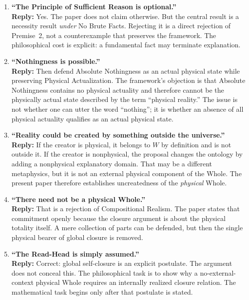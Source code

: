 \documentclass[11pt]{article}
\theoremstyle{canonstyle}
\begin{document}
\begin{enumerate}
    \item \textbf{``The Principle of Sufficient Reason is optional.''} \\
    \textbf{Reply:} Yes. The paper does not claim otherwise. But the central result is a necessity result \emph{under} No Brute Facts. Rejecting it is a direct rejection of Premise~2, not a counterexample that preserves the framework. The philosophical cost is explicit: a fundamental fact may terminate explanation.

    \item \textbf{``Nothingness is possible.''} \\
    \textbf{Reply:} Then defend Absolute Nothingness as an actual physical state while preserving Physical Actualization. The framework's objection is that Absolute Nothingness contains no physical actuality and therefore cannot be the physically actual state described by the term ``physical reality.'' The issue is not whether one can utter the word ``nothing''; it is whether an absence of all physical actuality qualifies as an actual physical state.

    \item \textbf{``Reality could be created by something outside the universe.''} \\
    \textbf{Reply:} If the creator is physical, it belongs to $W$ by definition and is not outside it. If the creator is nonphysical, the proposal changes the ontology by adding a nonphysical explanatory domain. That may be a different metaphysics, but it is not an external physical component of the Whole. The present paper therefore establishes uncreatedness of the \emph{physical} Whole.

    \item \textbf{``There need not be a physical Whole.''} \\
    \textbf{Reply:} That is a rejection of Compositional Realism. The paper states that commitment openly because the closure argument is about the physical totality itself. A mere collection of parts can be defended, but then the single physical bearer of global closure is removed.

    \item \textbf{``The Read-Head is simply assumed.''} \\
    \textbf{Reply:} Correct: global self-closure is an explicit postulate. The argument does not conceal this. The philosophical task is to show why a no-external-context physical Whole requires an internally realized closure relation. The mathematical task begins only after that postulate is stated.


\end{enumerate}
\end{document}
